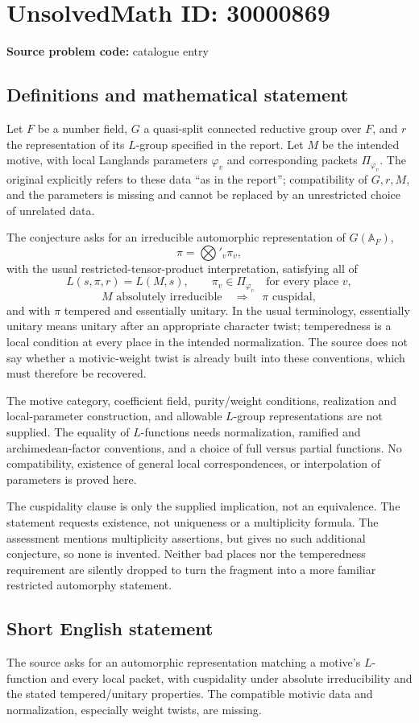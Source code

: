 \documentclass[11pt]{article}
\begin{document}
\section*{UnsolvedMath ID: 30000869}
\textbf{Source problem code:} catalogue entry
\subsection{Definitions and mathematical statement}
Let $F$ be a number field, $G$ a quasi-split connected reductive group over $F$, and $r$ the representation of its $L$-group specified in the report. Let $M$ be the intended motive, with local Langlands parameters $\varphi_v$ and corresponding packets $\Pi_{\varphi_v}$. The original explicitly refers to these data ``as in the report''; compatibility of $G,r,M$, and the parameters is missing and cannot be replaced by an unrestricted choice of unrelated data.

The conjecture asks for an irreducible automorphic representation of $G(\mathbb A_F)$,
\[
 \pi=\bigotimes'_v\pi_v,
\]
with the usual restricted-tensor-product interpretation, satisfying all of
\[
 L(s,\pi,r)=L(M,s),\qquad
 \pi_v\in\Pi_{\varphi_v}\quad\text{for every place }v,
\]
\[
 M\text{ absolutely irreducible}\quad\Longrightarrow\quad
 \pi\text{ cuspidal},
\]
and with $\pi$ tempered and essentially unitary. In the usual terminology, essentially unitary means unitary after an appropriate character twist; temperedness is a local condition at every place in the intended normalization. The source does not say whether a motivic-weight twist is already built into these conventions, which must therefore be recovered.

The motive category, coefficient field, purity/weight conditions, realization and local-parameter construction, and allowable $L$-group representations are not supplied. The equality of $L$-functions needs normalization, ramified and archimedean-factor conventions, and a choice of full versus partial functions. No compatibility, existence of general local correspondences, or interpolation of parameters is proved here.

The cuspidality clause is only the supplied implication, not an equivalence. The statement requests existence, not uniqueness or a multiplicity formula. The assessment mentions multiplicity assertions, but gives no such additional conjecture, so none is invented. Neither bad places nor the temperedness requirement are silently dropped to turn the fragment into a more familiar restricted automorphy statement.
\subsection{Short English statement}
The source asks for an automorphic representation matching a motive's $L$-function and every local packet, with cuspidality under absolute irreducibility and the stated tempered/unitary properties. The compatible motivic data and normalization, especially weight twists, are missing.
\end{document}
